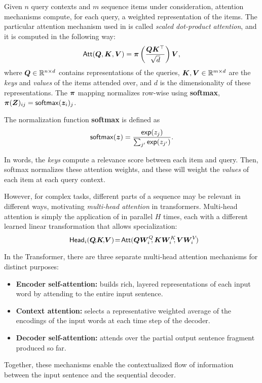 Given $n$ query contexts and $m$ sequence items under consideration,
attention mechanisms compute, for each query, a weighted
representation of the items. The particular attention mechanism used
in \citet{vaswani2017attention} is called \emph{scaled dot-product
    attention}, and it is computed in the following way:
%
\begin{equation}
    \operatorname{\mathsf{Att}}(\bm{Q}, \bm{K}, \bm{V}) = \bm{\pi}
    \left(\frac{\bm{Q}\bm{K}^\top}{\sqrt{d}}\right) \bm{V},
    \label{eq:att_scaled_dot}
\end{equation}
%
where $\bm{Q} \in \mathbb{R}^{n \times d}$ contains
representations of the queries, $\bm{K}, \bm{V} \in \mathbb{R}^{m \times
        d}$ are the \emph{keys} and \emph{values} of the items attended over,
and $d$ is the dimensionality of these representations. The $\bm{\pi}$
mapping normalizes row-wise using \textbf{softmax},
$\bm{\pi}(\bm{Z})_{ij} = \operatorname*{\mathsf{softmax}}(\bm{z}_i)_j$.

\begin{definition}
    The normalization function \textbf{softmax} is defined as
    \begin{equation}\label{eq:softmax}
        \operatorname*{\mathsf{softmax}}(\bm{z}) = \frac{\operatorname*{\mathsf{exp}}(z_j)}{\sum_{j'} \operatorname*{\mathsf{exp}}(z_{j'})}.
    \end{equation}
\end{definition}

In words, the \emph{keys} compute a relevance score between each item
and query. Then, softmax normalizes these attention weights, and
these will weight the \emph{values} of each item at each query
context.

However, for complex tasks, different parts of a sequence may be
relevant in different ways, motivating \emph{multi-head attention} in
transformers. Multi-head attention is simply the application of
 in parallel $H$ times, each with a
different learned linear transformation that allows specialization:
%
\begin{equation}\label{eq:head}%
    \hspace{-.01ex}%
    \ath_i(\bm{Q}\!,\!\bm{K}\!,\!\bm{V})\!=\!\att(\bm{QW}_i^Q\!\!,\bm{KW}_i^K\!\!,\bm{VW}_i^V\!)%
    \hspace{-1.5ex}%
\end{equation}

In the Transformer, there are three separate multi-head attention mechanisms for
distinct purposes:
\begin{itemize}
    \item \textbf{Encoder self-attention:} builds rich, layered representations of
          each input word by attending to the entire input sentence.
    \item \textbf{Context attention:} selects
          a representative weighted average of the encodings of the input words at each
          time step of the decoder.
    \item \textbf{Decoder self-attention:} attends over the partial output sentence
          fragment produced so far.
\end{itemize}
Together, these mechanisms enable the contextualized flow of information between
the input sentence and the sequential decoder.

